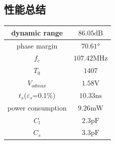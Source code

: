 \documentclass[a4paper]{article}
\newcommand{\uV}{\si{\volt}}
\newcommand{\upF}{\si{\pico\farad}}
\newcommand{\uns}{\si{\nano\second}}
\newcommand{\umW}{\si{\milli\watt}}
\newcommand{\uMHz}{\si{\mega\hertz}}
\newcommand{\udB}{\si{\deci\bel}}
\newcommand{\udeg}{\si{\degree}}
\begin{document}
\subsection{性能总结}
\begin{table}[htbp]
    \begin{tabular}{|c|c|}
        \hline
        dynamic range&$86.05\udB$
        \\\hline
        phase margin&$70.61\udeg$
        \\\hline
        $f_c$ &$107.42\uMHz$
        \\\hline 
        $T_0$&$1407$
        \\\hline
        $V_{odmax}$&$1.58\uV$
        \\\hline
        $t_s$($\varepsilon_s$=0.1\%)&$10.33\uns$
        \\\hline
        power consumption&$9.26\umW$
        \\\hline
        $C_l$&$2.3\upF$
        \\\hline
        $C_s$&$3.3\upF$
        \\\hline
    \end{tabular}
\end{table}






\end{document}

